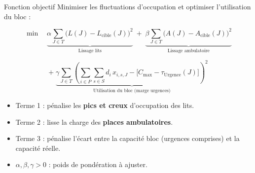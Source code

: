 \begin{frame}{Fonction objectif}
  \small
  Minimiser les fluctuations d'occupation et optimiser l'utilisation du bloc :

  $$\min \quad \underbrace{\alpha \sum_{J \in T} \bigl(L(J) - L_{\text{cible}}(J)\bigr)^{\!2}}_{\text{Lissage lits}}
  \;+\; \underbrace{\beta \sum_{J \in T} \bigl(A(J) - A_{\text{cible}}(J)\bigr)^{\!2}}_{\text{Lissage ambulatoire}}$$

  $$+\; \underbrace{\gamma \sum_{J \in T} \left( \sum_{i \in P} \sum_{s \in S} d_i\, x_{i,s,J} - \bigl[C_{\max} - \tau_{\text{Urgence}}(J)\bigr] \right)^{\!2}}_{\text{Utilisation du bloc (marge urgences)}}$$

  \vspace{0.3em}
  \begin{itemize}
    \item Terme 1 : pénalise les \textbf{pics et creux} d'occupation des lits.
    \item Terme 2 : lisse la charge des \textbf{places ambulatoires}.
    \item Terme 3 : pénalise l'écart entre la capacité bloc (urgences comprises) et la capacité réelle.
    \item $\alpha, \beta, \gamma > 0$ : poids de pondération à ajuster.
  \end{itemize}
\end{frame}
